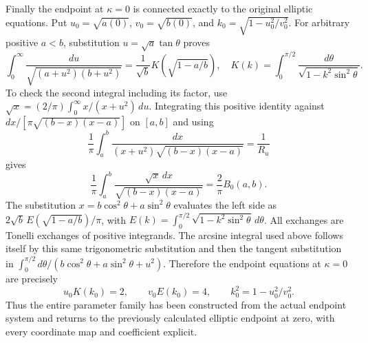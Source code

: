 Finally the endpoint at $\kappa=0$ is connected exactly to the original
elliptic equations. Put $u_0=\sqrt{a(0)}$, $v_0=\sqrt{b(0)}$, and
$k_0=\sqrt{1-u_0^2/v_0^2}$. For arbitrary positive $a<b$, substitution
$u=\sqrt a\tan\theta$ proves
\[
 \int_0^\infty\frac{du}{\sqrt{(a+u^2)(b+u^2)}}
 =\frac1{\sqrt b}K\left(\sqrt{1-a/b}\right),
 \quad
 K(k)=\int_0^{\pi/2}\frac{d\theta}
                   {\sqrt{1-k^2\sin^2\theta}}.
\]
To check the second integral including its factor, use
$\sqrt{x}=(2/\pi)\int_0^\infty x/(x+u^2)\,du$.
Integrating this positive identity against
$dx/[\pi\sqrt{(b-x)(x-a)}]$ on $[a,b]$ and using
\[
 \frac1\pi\int_a^b
 \frac{dx}{(x+u^2)\sqrt{(b-x)(x-a)}}=\frac1{R_u}
\]
gives
\[
 \frac1\pi\int_a^b
 \frac{\sqrt{x}\,dx}{\sqrt{(b-x)(x-a)}}
 =\frac2\pi B_0(a,b).
\]
The substitution $x=b\cos^2\theta+a\sin^2\theta$ evaluates the
left side as $2\sqrt b\,E(\sqrt{1-a/b})/\pi$, with
$E(k)=\int_0^{\pi/2}\sqrt{1-k^2\sin^2\theta}\,d\theta$.
All exchanges are Tonelli exchanges of positive integrands. The
arcsine integral used above follows itself by this same trigonometric
substitution and then the tangent substitution in
$\int_0^{\pi/2}d\theta/(b\cos^2\theta+a\sin^2\theta+u^2)$.
Therefore the endpoint equations at $\kappa=0$ are precisely
\begin{equation}\tag{KEP20}
 u_0K(k_0)=2,\qquad v_0E(k_0)=4,
 \qquad k_0^2=1-u_0^2/v_0^2.
\end{equation}
Thus the entire parameter family has been constructed from the actual
endpoint system and returns to the previously calculated elliptic
endpoint at zero, with every coordinate map and coefficient explicit.

